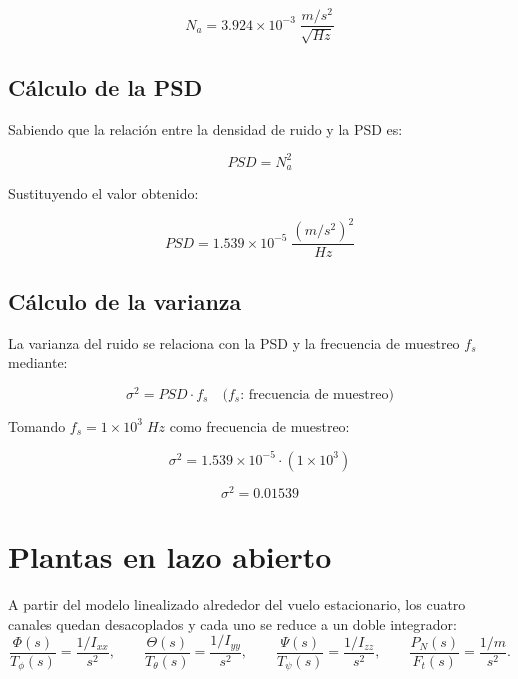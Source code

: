 \documentclass[11pt,a4paper]{article}
\begin{document}
\begin{equation}
    N_a = 3.924 \times 10^{-3} \; \dfrac{m/s^2}{\sqrt{Hz}}
\end{equation}
 
\subsection{Cálculo de la PSD}
 
Sabiendo que la relación entre la densidad de ruido y la PSD es:
 
\begin{equation}
    PSD = N_a^2
\end{equation}
 
Sustituyendo el valor obtenido:
 
\begin{equation}
    PSD = 1.539 \times 10^{-5} \; \dfrac{(m/s^2)^2}{Hz}
\end{equation}
 
\subsection{Cálculo de la varianza}
 
La varianza del ruido se relaciona con la PSD y la frecuencia de muestreo $f_s$ mediante:
 
\begin{equation}
    \sigma^2 = PSD \cdot f_s \quad \text{(} f_s \text{: frecuencia de muestreo)}
\end{equation}
 
Tomando $f_s = 1 \times 10^{3} \; Hz$ como frecuencia de muestreo:
 
\begin{equation}
    \sigma^2 = 1.539 \times 10^{-5} \cdot (1 \times 10^{3})
\end{equation}
 
\begin{equation}
    \boxed{\sigma^2 = 0.01539}
\end{equation}

\section{Plantas en lazo abierto}

A partir del modelo linealizado alrededor del vuelo estacionario, los cuatro
canales quedan desacoplados y cada uno se reduce a un doble integrador:
\begin{equation}
\frac{\Phi(s)}{T_\phi(s)}=\frac{1/I_{xx}}{s^{2}},\qquad
\frac{\Theta(s)}{T_\theta(s)}=\frac{1/I_{yy}}{s^{2}},\qquad
\frac{\Psi(s)}{T_\psi(s)}=\frac{1/I_{zz}}{s^{2}},\qquad
\frac{P_N(s)}{F_t(s)}=\frac{1/m}{s^{2}} .
\label{eq:plantas}
\end{equation}
\end{document}
